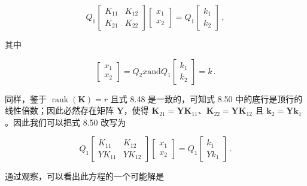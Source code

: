 \documentclass[10pt,a4paper]{book}
\theoremstyle{thmstyle} %
\theoremstyle{defstyle} %
\theoremstyle{prostyle} %
\begin{document}
$$
Q _ { 1 } \left[ \begin{array}{ll} { K _ { 11 } } & { K _ { 12 } } \\{ K _ { 21 } } & { K _ { 22 } } \end{array} \right] \left[ \begin{array}{l} { x _ { 1 } } \\{ x _ { 2 } } \end{array} \right] = Q _ { 1 } \left[ \begin{array}{l} { k _ { 1 } } \\{ k _ { 2 } } \end{array} \right] \, ,
$$



其中



$$
\left[ \begin{array}{l} { x _ { 1 } } \\{ x _ { 2 } } \end{array} \right] = Q _ { 2 } x  \mathrm { a n d }  Q _ { 1 } \left[ \begin{array}{l} { k _ { 1 } } \\{ k _ { 2 } } \end{array} \right] = k \, .
$$



同样，鉴于 $\operatorname{rank}(\boldsymbol{K})=r$ 且式 8.48 是一致的，可知式 8.50 中的底行是顶行的线性倍数；因此必然存在矩阵 $\boldsymbol{Y}$，使得 $\boldsymbol{K}_{21}=\boldsymbol{Y} \boldsymbol{K}_{11}$、$\boldsymbol{K}_{22}=\boldsymbol{Y} \boldsymbol{K}_{12}$ 且 $\boldsymbol{k}_{2}=\boldsymbol{Y} \boldsymbol{k}_{1}$。因此我们可以把式 8.50 改写为



$$
Q _ { 1 } \left[ \begin{array}{ll} { K _ { 11 } } & { K _ { 12 } } \\{ Y K _ { 11 } } & { Y K _ { 12 } } \end{array} \right] \left[ \begin{array}{l} { x _ { 1 } } \\{ x _ { 2 } } \end{array} \right] = Q _ { 1 } \left[ \begin{array}{l} { k _ { 1 } } \\{ Y k _ { 1 } } \end{array} \right] \, .
$$



通过观察，可以看出此方程的一个可能解是
\end{document}
